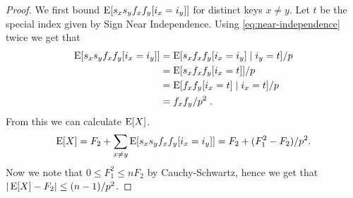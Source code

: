 \begin{proof}
    We first bound $\operatorname*{E}[s_x s_y f_x f_y [i_x = i_y]]$ for distinct keys
    $x \neq y$.
    Let $t$ be the special index given by Sign Near Independence.
    Using \cref{eq:near-independence} twice we get that
    \begin{equation}\begin{split}\label{eq:twice-split}
        \operatorname*{E}[s_x s_y f_x f_y [i_x = i_y]]
            &= \operatorname*{E}[s_x f_x f_y [i_x = i_y] \mid i_y = t]/p
            \\&= \operatorname*{E}[s_x f_x f_y [i_x = t]]/p
            \\&= \operatorname*{E}[f_x f_y [i_x = t] \mid i_x = t]/p
            \\&= f_x f_y / p^2 \; .
    \end{split}\end{equation}
    From this we can calculate $\operatorname*{E}[X]$.
    \begin{align*}
        \operatorname*{E}[X]
            = F_2 + \sum_{x \neq y} \operatorname*{E}[s_x s_y f_x f_y [i_x = i_y]]
            = F_2 + (F_1^2 - F_2)/p^2 .
    \end{align*}
    Now we note that $0 \le F_1^2 \le n F_2$ by Cauchy-Schwartz, hence we get that
    $| \operatorname*{E}[X] - F_2 | \le (n - 1)/p^2$.


\end{proof}
